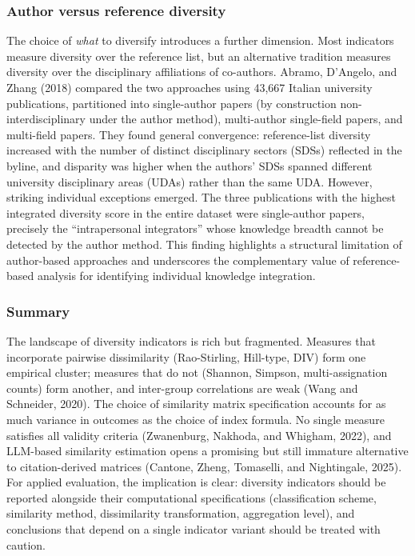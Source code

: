 \documentclass[
]{article}
\begin{document}
\hypertarget{author-versus-reference-diversity}{%
\subsubsection{Author versus reference
diversity}\label{author-versus-reference-diversity}}

The choice of \emph{what} to diversify introduces a further dimension.
Most indicators measure diversity over the reference list, but an
alternative tradition measures diversity over the disciplinary
affiliations of co-authors. Abramo, D'Angelo, and Zhang (2018) compared
the two approaches using 43,667 Italian university publications,
partitioned into single-author papers (by construction
non-interdisciplinary under the author method), multi-author
single-field papers, and multi-field papers. They found general
convergence: reference-list diversity increased with the number of
distinct disciplinary sectors (SDSs) reflected in the byline, and
disparity was higher when the authors' SDSs spanned different university
disciplinary areas (UDAs) rather than the same UDA. However, striking
individual exceptions emerged. The three publications with the highest
integrated diversity score in the entire dataset were single-author
papers, precisely the ``intrapersonal integrators'' whose knowledge
breadth cannot be detected by the author method. This finding highlights
a structural limitation of author-based approaches and underscores the
complementary value of reference-based analysis for identifying
individual knowledge integration.

\hypertarget{summary}{%
\subsubsection{Summary}\label{summary}}

The landscape of diversity indicators is rich but fragmented. Measures
that incorporate pairwise dissimilarity (Rao-Stirling, Hill-type, DIV)
form one empirical cluster; measures that do not (Shannon, Simpson,
multi-assignation counts) form another, and inter-group correlations are
weak (Wang and Schneider, 2020). The choice of similarity matrix
specification accounts for as much variance in outcomes as the choice of
index formula. No single measure satisfies all validity criteria
(Zwanenburg, Nakhoda, and Whigham, 2022), and LLM-based similarity
estimation opens a promising but still immature alternative to
citation-derived matrices (Cantone, Zheng, Tomaselli, and Nightingale,
2025). For applied evaluation, the implication is clear: diversity
indicators should be reported alongside their computational
specifications (classification scheme, similarity method, dissimilarity
transformation, aggregation level), and conclusions that depend on a
single indicator variant should be treated with caution.
\end{document}
